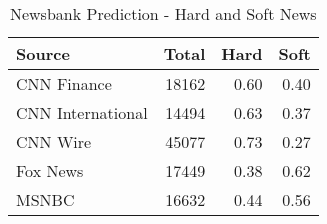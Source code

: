 \begin{table}[ht]
\centering
\caption{Newsbank Prediction - Hard and Soft News} 
\label{tab:newsbank_predict}
\begin{tabular}{lrrr}
  \hline
Source & Total & Hard & Soft \\ 
  \hline
CNN Finance & 18162 & 0.60 & 0.40 \\ 
  CNN International & 14494 & 0.63 & 0.37 \\ 
  CNN Wire & 45077 & 0.73 & 0.27 \\ 
  Fox News & 17449 & 0.38 & 0.62 \\ 
  MSNBC & 16632 & 0.44 & 0.56 \\ 
   \hline
\end{tabular}
\end{table}
